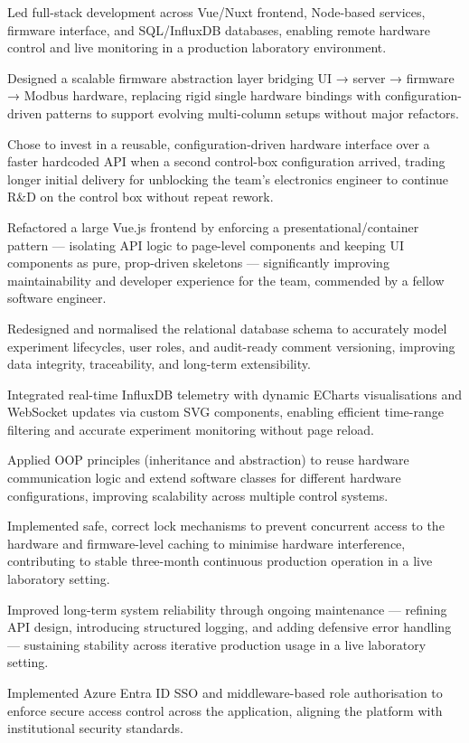 \documentclass[letterpaper,11pt]{article}
\newcommand{\resumeItem}[1]{
  \item\small #1
}
\begin{document}
            \resumeItem{Led full-stack development across Vue/Nuxt frontend, Node-based services, firmware interface, and SQL/InfluxDB databases, enabling remote hardware control and live monitoring in a production laboratory environment.}
            \resumeItem{Designed a scalable firmware abstraction layer bridging UI → server → firmware → Modbus hardware, replacing rigid single hardware bindings with configuration-driven patterns to support evolving multi-column setups without major refactors.}
            \resumeItem{Chose to invest in a reusable, configuration-driven hardware interface over a faster hardcoded API when a second control-box configuration arrived, trading longer initial delivery for unblocking the team's electronics engineer to continue R\&D on the control box without repeat rework.}
            \resumeItem{Refactored a large Vue.js frontend by enforcing a presentational/container pattern — isolating API logic to page-level components and keeping UI components as pure, prop-driven skeletons — significantly improving maintainability and developer experience for the team, commended by a fellow software engineer.}
            \resumeItem{Redesigned and normalised the relational database schema to accurately model experiment lifecycles, user roles, and audit-ready comment versioning, improving data integrity, traceability, and long-term extensibility.}
            \resumeItem{Integrated real-time InfluxDB telemetry with dynamic ECharts visualisations and WebSocket updates via custom SVG components, enabling efficient time-range filtering and accurate experiment monitoring without page reload.}
            \resumeItem{Applied OOP principles (inheritance and abstraction) to reuse hardware communication logic and extend software classes for different hardware configurations, improving scalability across multiple control systems.}
            \resumeItem{Implemented safe, correct lock mechanisms to prevent concurrent access to the hardware and firmware-level caching to minimise hardware interference, contributing to stable three-month continuous production operation in a live laboratory setting.}
            \resumeItem{Improved long-term system reliability through ongoing maintenance — refining API design, introducing structured logging, and adding defensive error handling — sustaining stability across iterative production usage in a live laboratory setting.}
            \resumeItem{Implemented Azure Entra ID SSO and middleware-based role authorisation to enforce secure access control across the application, aligning the platform with institutional security standards.}
\end{document}
